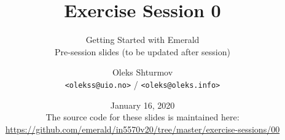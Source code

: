 \documentclass[xcolor=table]{beamer}
\title{{\Large Exercise Session 0}}
\subtitle{Getting Started with Emerald\\Pre-session slides (to be updated after session)}
\institute{{University of Oslo}\\[0.2em] IN[59]570: Distributed Objects}
\author{Oleks Shturmov\\[-0.2em]%
  {\footnotesize \texttt{<olekss@uio.no>} / \texttt{<oleks@oleks.info>}}
}
\date{January 16, 2020\\[2em]
{\scriptsize The source code for these slides is maintained here: \\[-0.5em] {\tiny%
\url{https://github.com/emerald/in5570v20/tree/master/exercise-sessions/00}}%
}}
\begin{document}
\begin{frame} \titlepage \end{frame}


















\end{document}
